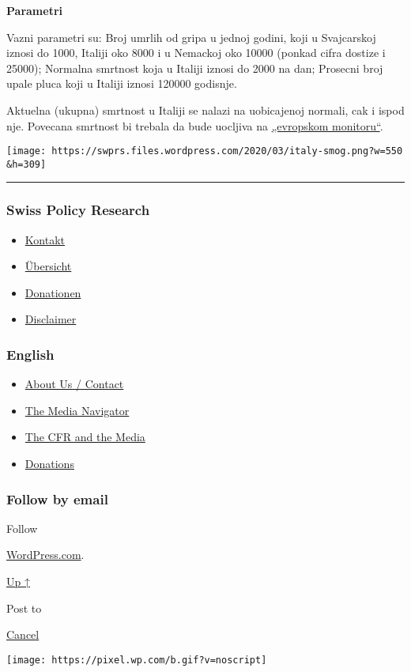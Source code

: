 \textbf{Parametri}

Vazni parametri su: Broj umrlih od gripa u jednoj godini, koji u
Svajcarskoj iznosi do 1000, Italiji oko 8000 i u Nemackoj oko 10000
(ponkad cifra dostize i 25000); Normalna smrtnost koja u Italiji iznosi
do 2000 na dan; Prosecni broj upale pluca koji u Italiji iznosi 120000
godisnje.

Aktuelna (ukupna) smrtnost u Italiji se nalazi na uobicajenoj normali,
cak i ispod nje. Povecana smrtnost bi trebala da bude uocljiva na
\href{https://www.euromomo.eu/index.html}{„evropskom monitoru``}.

\texttt{[image: https://swprs.files.wordpress.com/2020/03/italy-smog.png?w=550\\\&h=309]}

\begin{center}\rule{0.5\linewidth}{\linethickness}\end{center}

\hypertarget{swiss-policy-research}{%
\subsubsection{Swiss Policy Research}\label{swiss-policy-research}}

\begin{itemize}
\tightlist
\item
  \href{https://swprs.org/kontakt/}{Kontakt}
\item
  \href{https://swprs.org/uebersicht/}{Übersicht}
\item
  \href{https://swprs.org/donationen/}{Donationen}
\item
  \href{https://swprs.org/disclaimer/}{Disclaimer}
\end{itemize}

\hypertarget{english}{%
\subsubsection{English}\label{english}}

\begin{itemize}
\tightlist
\item
  \href{https://swprs.org/contact/}{About Us / Contact}
\item
  \href{https://swprs.org/media-navigator/}{The Media Navigator}
\item
  \href{https://swprs.org/the-american-empire-and-its-media/}{The CFR
  and the Media}
\item
  \href{https://swprs.org/donations/}{Donations}
\end{itemize}

\hypertarget{follow-by-email}{%
\subsubsection{Follow by email}\label{follow-by-email}}

Follow

\href{https://wordpress.com/?ref=footer_custom_com}{WordPress.com}.

\protect\hyperlink{}{Up ↑}

Post to

\protect\hyperlink{}{Cancel}

\texttt{[image: https://pixel.wp.com/b.gif?v=noscript]}

